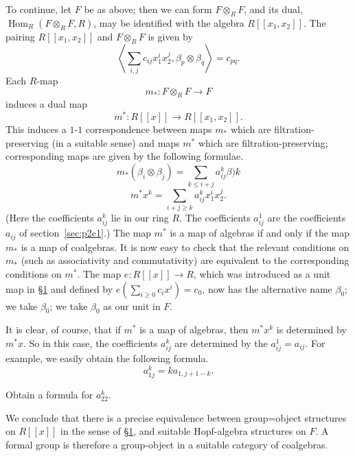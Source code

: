 \documentclass[../main]{subfiles}
\begin{document}
To continue, let $F$ be as above; then we can form $F\otimes_R F$, and its dual, $\operatorname{Hom}_R(F\otimes_R F, R)$, may be identified with the algebra $R[[x_1,x_2]]$. The pairing $R[[x_1,x_2]]$ and $F\otimes_R F$ is given by 
\begin{equation}
\label{eqn:p2c03.3}
\tag{3.3}    \left<\sum_{i,j}c_{ij}x_1^ix_2^j, \beta_p\otimes\beta_q\right> = c_{pq}.
\end{equation}
Each $R$-map
$$m_\ast:F\otimes_R F\longrightarrow F$$
induces a dual map
$$m^\ast:R[[x]]\longrightarrow R[[x_1,x_2]].$$
This induces a $1$-$1$ correspondence between maps $m_\ast$ which are filtration-preserving (in a suitable sense) and maps $m^\ast$ which are filtration-preserving; corresponding maps are given by the following formulae.
\begin{equation}
\label{eqn:p2c03.4}
\tag{3.4}
m_\ast(\beta_i\otimes\beta_j)=\sum_{k\leq i+j}a_{ij}^k\beta)k
\end{equation}
\begin{equation}
\label{eqn:p2c03.5}
\tag{3.5}
    m^\ast x^k=\sum_{i+j\geq k}a_{ij}^kx_1^ix_2^j.
\end{equation}
(Here the coefficients $a_{ij}^k$ lie in our ring $R$. The coefficients $a_{ij}^1$ are the coefficients $a_{ij}$ of section~\ref{sec:p2c1}.) The map $m^\ast$ is a map of algebras if and only if the map $m_\ast$ is a map of coalgebras. It is now easy to check that the relevant conditions on $m_\ast$ (such as associativity and commutativity) are equivalent to the corresponding conditions on $m^\ast$. The map $e:R[[x]]\longrightarrow R$, which was introduced as a unit map in \hyperref[sec:p2c1]{\S 1} and defined by $e\left(\sum_{i\geq 0}c_ix^i\right)=c_0$, now has the alternative name $\beta_0$; we take $\beta_0$; we take $\beta_0$ as our unit in $F$.

It is clear, of course, that if $m^\ast$ is a map of algebras, then $m^\ast x^k$ is determined by $m^\ast x$. So in this case, the coefficients $a_{ij}^k$ are determined by the $a_{ij}^1=a_{ij}$. For example, we easily obtain the following formula.
\begin{equation}
\label{eqn:p2c03.6}
\tag{3.6}
    a_{1j}^k = ka_{1,j+1-k}.
\end{equation}

\begin{exercise}
Obtain a formula for $a_{22}^k.$
\end{exercise}

We conclude that there is a precise equivalence between group=object structures on $R[[x]]$ in the sense of \hyperref[sec:p2c1]{\S 1}, and suitable Hopf-algebra structures on $F$. A formal group is therefore a group-object in a suitable category of coalgebras.
\end{document}
